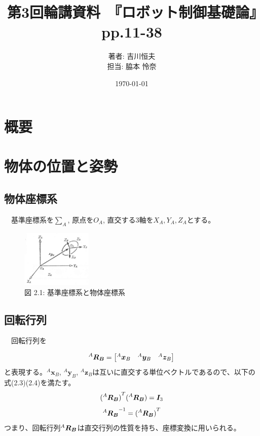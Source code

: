 \documentclass{article}
\begin{document}
\title{第3回輪講資料　『ロボット制御基礎論』　pp.11-38}
\author{著者: 吉川恒夫 \\ 担当: 脇本 怜奈}
\date{\today}
\maketitle

\section*{概要}

\setcounter{section}{0}
\renewcommand{\thesection}{2.\arabic{section}}

\section{物体の位置と姿勢}
\subsection{物体座標系}
　基準座標系を\(\sum_{A}\), 原点を\(O_A\), 直交する3軸を\(X_A, Y_A, Z_A\)とする。 

\begin{figure}[H]
    \centering
    \includegraphics[width=0.3\textwidth]{images/2_1.jpg}
    \caption{図 2.1: 基準座標系と物体座標系}
    \label{fig:2.1}
\end{figure}

\subsection{回転行列}
　回転行列を

\begin{equation}
    ^{A}\vb*{R_B} = 
    \begin{bmatrix}
        ^{A}{\bm{x}_B} & ^{A}{\bm{y}_B} & ^{A}{\bm{z}_B}
    \end{bmatrix}
\end{equation}
と表現する。\(^{A}{\bm{x}_B}\), \(^{A}{\bm{y}_B}\), \(^{A}{\bm{z}_B}\)は互いに直交する単位ベクトルであるので、以下の式(2.3)(2.4)を満たす。
\begin{equation}
    {(^{A}\vb*{R_B})}^T(^{A}\vb*{R_B}) = 
        \bm{I}_3
\end{equation}
\begin{equation}
    {^{A}\vb*{R_B}}^{-1} = 
        {(^{A}\vb*{R_B})}^T
\end{equation}
つまり、回転行列\(^{A}\vb*{R_B}\)は直交行列の性質を持ち、座標変換に用いられる。
\end{document}
